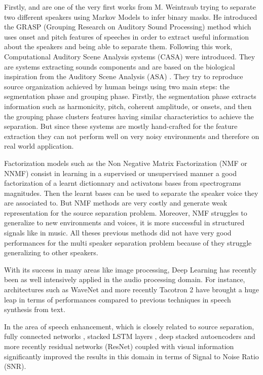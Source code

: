 \documentclass[master, tikz, final,11pt, dvipdfmx]{iscs-thesis}
\begin{document}
Firstly, \cite{Weintraub:1985:TCM:912498} and \cite{GRASP} are one of the very first works from M. Weintraub trying to separate two different speakers using Markov Models to infer binary masks. He introduced the GRASP (Grouping Research on Auditory Sound Processing) method which uses onset and pitch features of speeches in order to extract useful information about the speakers and being able to separate them.
Following this work, Computational Auditory Scene Analysis systems (CASA) \cite{CASA1, CASA2} were introduced. They are systems extracting sounds components and are based on the biological inspiration from the Auditory Scene Analysis (ASA) \cite{ASA}. They try to reproduce source organization achieved by human beings using two main steps: the segmentation phase and grouping phase. Firstly, the segmentation phase extracts information such as harmonicity, pitch, coherent amplitude, or onsets, and then the grouping phase clusters features having similar characteristics to achieve the separation. But since these systems are mostly hand-crafted for the feature extraction they can not perform well on very noisy environments and therefore on real world application. 

Factorization models such as the Non Negative Matrix Factorization \cite{SNMF, NMFalgo} (NMF or NNMF) consist in learning in a supervised or unsupervised manner a good factorization of a learnt dictionnary and activatons bases from spectrograms magnitudes. Then the learnt bases can be used to separate the speaker voice they are associated to. But NMF methods are very costly and generate weak representation for the source separation problem. Moreover, NMF struggles to generalize to new environments and voices, it is more successful in structured signals like in music.
All theses previous methods did not have very good performances for the multi speaker separation problem because of they struggle generalizing to other speakers.

With its success in many areas like image processing, Deep Learning has recently been as well intensively applied in the audio processing domain. For instance, architectures such as WaveNet \cite{WaveNet} and more recently Tacotron 2 \cite{Tacotron2} have brought a huge leap in terms of performances compared to previous techniques in speech synthesis from text.

In the area of speech enhancement, which is closely related to source separation, fully connected networks \cite{DLSS}, stacked LSTM layers \cite{SELSTM, DAVSE}, deep stacked autoencoders \cite{AESE} and more recently residual networks (ResNet) coupled with visual information \cite{SpeechEnh} significantly improved the results in this domain in terms of Signal to Noise Ratio (SNR).
\end{document}
